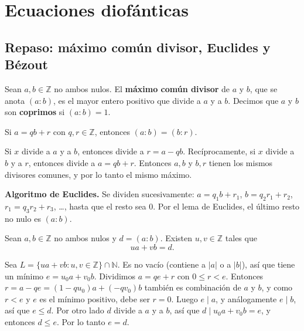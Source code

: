\chapter{Ecuaciones diofánticas}

\section{Repaso: máximo común divisor, Euclides y Bézout}

\begin{definicion}
Sean $a,b\in\mathbb{Z}$ no ambos nulos. El \textbf{máximo común divisor} de $a$ y
$b$, que se anota $(a:b)$, es el mayor entero positivo que divide a $a$ y a $b$.
Decimos que $a$ y $b$ son \textbf{coprimos} si $(a:b)=1$.
\end{definicion}

\begin{proposicion}[{title={Lema de Euclides}}]
Si $a=qb+r$ con $q,r\in\mathbb{Z}$, entonces $(a:b)=(b:r)$.
\end{proposicion}

\begin{demostracion}
Si $x$ divide a $a$ y a $b$, entonces divide a $r=a-qb$. Recíprocamente, si $x$
divide a $b$ y a $r$, entonces divide a $a=qb+r$. Entonces $a,b$ y $b,r$ tienen
los mismos divisores comunes, y por lo tanto el mismo máximo.
\end{demostracion}

\begin{nota}
\textbf{Algoritmo de Euclides.} Se dividen sucesivamente: $a=q_1b+r_1$,
$b=q_2r_1+r_2$, $r_1=q_3r_2+r_3$, \dots, hasta que el resto sea $0$. Por el lema
de Euclides, el último resto no nulo es $(a:b)$.
\end{nota}

\begin{proposicion}[{title={Lema de Bézout}}]
Sean $a,b\in\mathbb{Z}$ no ambos nulos y $d=(a:b)$. Existen $u,v\in\mathbb{Z}$ tales
que
\[
ua+vb=d.
\]
\end{proposicion}

\begin{demostracion}
Sea $L=\{ua+vb : u,v\in\mathbb{Z}\}\cap\mathbb{N}$. Es no vacío (contiene a $|a|$
o a $|b|$), así que tiene un mínimo $e=u_0a+v_0b$. Dividimos $a=qe+r$ con
$0\le r<e$. Entonces $r=a-qe=(1-qu_0)a+(-qv_0)b$ también es combinación de $a$ y
$b$, y como $r<e$ y $e$ es el mínimo positivo, debe ser $r=0$. Luego $e\mid a$, y
análogamente $e\mid b$, así que $e\le d$. Por otro lado $d$ divide a $a$ y a $b$,
así que $d\mid u_0a+v_0b=e$, y entonces $d\le e$. Por lo tanto $e=d$.
\end{demostracion}

